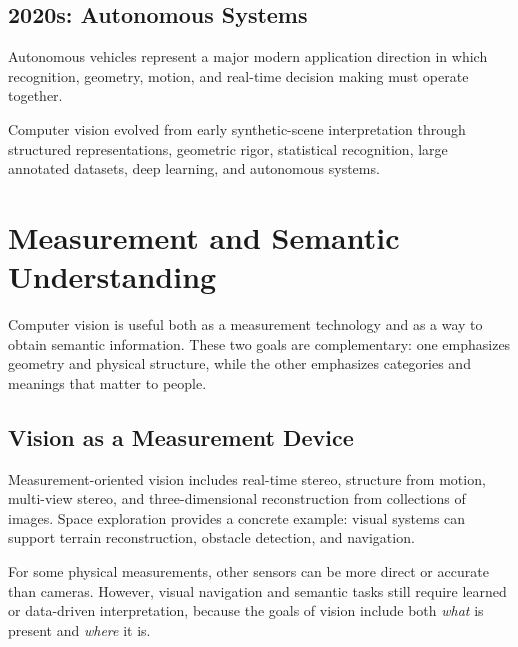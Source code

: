 \documentclass[11pt,a4paper,oneside]{report}
\begin{document}
\section{2020s: Autonomous Systems}

Autonomous vehicles represent a major modern application direction in which recognition, geometry, motion, and real-time decision making must operate together.

\FloatBarrier
\begin{chaptersummary}
Computer vision evolved from early synthetic-scene interpretation through structured representations, geometric rigor, statistical recognition, large annotated datasets, deep learning, and autonomous systems.
\end{chaptersummary}

\chapter{Measurement and Semantic Understanding}

Computer vision is useful both as a measurement technology and as a way to obtain semantic information. These two goals are complementary: one emphasizes geometry and physical structure, while the other emphasizes categories and meanings that matter to people.

\section{Vision as a Measurement Device}

Measurement-oriented vision includes real-time stereo, structure from motion, multi-view stereo, and three-dimensional reconstruction from collections of images. Space exploration provides a concrete example: visual systems can support terrain reconstruction, obstacle detection, and navigation.

\begin{keyconcept}
For some physical measurements, other sensors can be more direct or accurate than cameras. However, visual navigation and semantic tasks still require learned or data-driven interpretation, because the goals of vision include both \emph{what} is present and \emph{where} it is.
\end{keyconcept}
\end{document}
